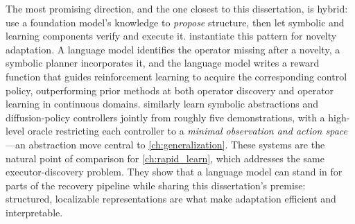 The most promising direction, and the one closest to this dissertation, is hybrid: use a foundation model's knowledge to \emph{propose} structure, then let symbolic and learning components verify and execute it. \citet{lu2026novelty} instantiate this pattern for novelty adaptation. A language model identifies the operator missing after a novelty, a symbolic planner incorporates it, and the language model writes a reward function that guides reinforcement learning to acquire the corresponding control policy, outperforming prior methods at both operator discovery and operator learning in continuous domains. \citet{lorang2025fewshot} similarly learn symbolic abstractions and diffusion-policy controllers jointly from roughly five demonstrations, with a high-level oracle restricting each controller to a \emph{minimal observation and action space}---an abstraction move central to \cref{ch:generalization}. These systems are the natural point of comparison for \cref{ch:rapid_learn}, which addresses the same executor-discovery problem. They show that a language model can stand in for parts of the recovery pipeline while sharing this dissertation's premise: structured, localizable representations are what make adaptation efficient and interpretable.
